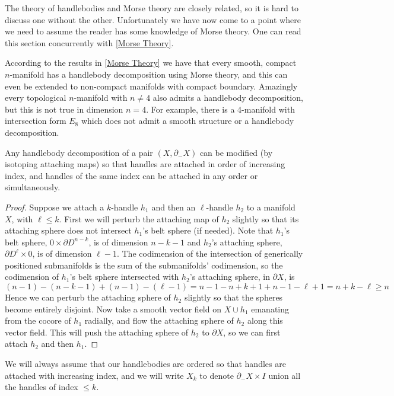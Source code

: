 The theory of handlebodies and Morse theory are closely related, so it is hard to discuss one without the other. Unfortunately we have now come to a point where we need to assume the reader has some knowledge of Morse theory. One can read this section concurrently with \cref{Morse Theory}.

According to the results in \cref{Morse Theory} we have that every smooth, compact $n$-manifold has a handlebody decomposition using Morse theory, and this can even be extended to non-compact manifolds with compact boundary. Amazingly every topological $n$-manifold with $n \neq 4$ also admits a handlebody decomposition, but this is not true in dimension $n=4$. For example, there is a 4-manifold with intersection form $E_8$ which does not admit a smooth structure or a handlebody decomposition.


\begin{prop}
\label{handlebodies with increasing index handles}
Any handlebody decomposition of a pair $(X,\partial_-X)$ can be modified (by isotoping attaching maps) so that handles are attached in order of increasing index, and handles of the same index can be attached in any order or simultaneously.
\end{prop}
\begin{proof}
Suppose we attach a $k$-handle $h_1$ and then an $\ell$-handle $h_2$ to a manifold $X$, with $\ell \leq k$. First we will perturb the attaching map of $h_2$ slightly so that its attaching sphere does not intersect $h_1$'s belt sphere (if needed). Note that $h_1$'s belt sphere, $0 \times \partial D^{n-k}$, is of dimension $n-k-1$ and $h_2$'s attaching sphere, $\partial D^\ell \times 0$, is of dimension $\ell-1$. The codimension of the intersection of generically positioned submanifolds is the sum of the submanifolds' codimension, so the codimension of $h_1$'s belt sphere intersected with $h_2$'s attaching sphere, in $\partial X$, is 
\[ (n-1)-(n-k-1) + (n-1)-(\ell-1) = n-1-n+k+1+n-1-\ell+1 = n + k-\ell \geq n \]
Hence we can perturb the attaching sphere of $h_2$ slightly so that the spheres become entirely disjoint. Now take a smooth vector field on $X \cup h_1$ emanating from the cocore of $h_1$ radially, and flow the attaching sphere of $h_2$ along this vector field. This will push the attaching sphere of $h_2$ to $\partial X$, so we can first attach $h_2$ and then $h_1$.
\end{proof}

We will always assume that our handlebodies are ordered so that handles are attached with increasing index, and we will write $X_k$ to denote $\partial_-X \times I$ union all the handles of index $\leq k$.

